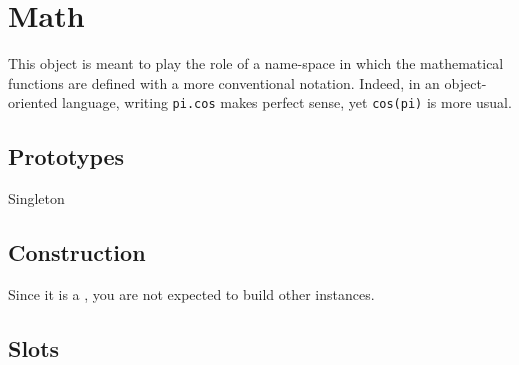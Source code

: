 
\section{Math}

This object is meant to play the role of a name-space in which the
mathematical functions are defined with a more conventional notation.
Indeed, in an object-oriented language, writing \lstinline|pi.cos| makes
perfect sense, yet \lstinline|cos(pi)| is more usual.

\subsection{Prototypes}
\begin{refObjects}
\item[Singleton]
\end{refObjects}

\subsection{Construction}

Since it is a , you are not expected to build other
instances.

\subsection{Slots}

